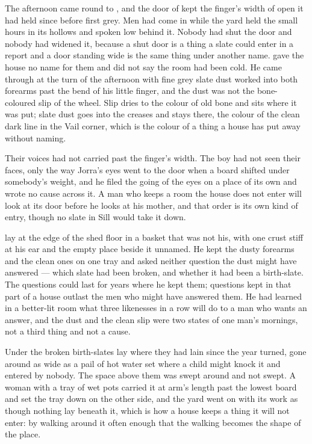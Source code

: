 The afternoon came round to , and the door of  kept the finger's width of open it had held since before first grey. Men had come in while the yard held the small hours in its hollows and spoken low behind it. Nobody had shut the door and nobody had widened it, because a shut door is a thing a slate could enter in a report and a door standing wide is the same thing under another name.  gave the house no name for them and did not say the room had been cold. He came through at the turn of the afternoon with fine grey slate dust worked into both forearms past the bend of his little finger, and the dust was not the bone-coloured slip of the wheel. Slip dries to the colour of old bone and sits where it was put; slate dust goes into the creases and stays there, the colour of the clean dark line in the Vail corner, which is the colour of a thing a house has put away without naming.

Their voices had not carried past the finger's width. The boy had not seen their faces, only the way Jorra's eyes went to the door when a board shifted under somebody's weight, and he filed the going of the eyes on a place of its own and wrote no cause across it. A man who keeps a room the house does not enter will look at its door before he looks at his mother, and that order is its own kind of entry, though no slate in Sill would take it down.

 lay at the edge of the shed floor in a basket that was not his, with one crust stiff at his ear and the empty place beside it unnamed. He kept the dusty forearms and the clean ones on one tray and asked neither question the dust might have answered --- which slate had been broken, and whether it had been a birth-slate. The questions could last for years where he kept them; questions kept in that part of a house outlast the men who might have answered them. He had learned in a better-lit room what three likenesses in a row will do to a man who wants an answer, and the dust and the clean slip were two states of one man's mornings, not a third thing and not a cause.

Under  the broken birth-slates lay where they had lain since the year turned, gone around as wide as a pail of hot water set where a child might knock it and entered by nobody. The space above them was swept around and not swept. A woman with a tray of wet pots carried it at arm's length past the lowest board and set the tray down on the other side, and the yard went on with its work as though nothing lay beneath it, which is how a house keeps a thing it will not enter: by walking around it often enough that the walking becomes the shape of the place.

